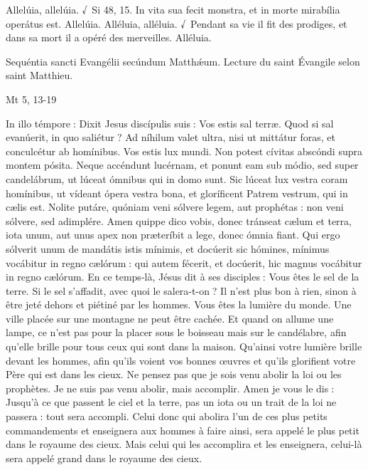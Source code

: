 \begin{paracol}{2}
Allelúia, allelúia. √~Si 48, 15. In vita sua fecit monstra, et in morte mirabília operátus est. Allelúia.
\switchcolumn
Alléluia, alléluia. √~Pendant sa vie il fit des prodiges, et dans sa mort il a opéré des merveilles. Alléluia.
\switchcolumn*

Sequéntia sancti Evangélii secúndum Matthǽum.
\switchcolumn
Lecture du saint Évangile selon saint Matthieu.
\switchcolumn*

Mt 5, 13-19
\switchcolumn

\switchcolumn*

In illo témpore : Dixit Jesus discípulis  suis : Vos estis sal terræ. Quod si sal evanúerit, in quo saliétur ? Ad níhilum valet ultra, nisi ut mittátur foras, et conculcétur ab homínibus. Vos estis lux mundi. Non potest cívitas abscóndi supra montem pósita. Neque accéndunt lucérnam, et ponunt eam sub módio, sed super candelábrum, ut lúceat ómnibus qui in domo sunt. Sic lúceat lux vestra coram homínibus, ut vídeant ópera vestra bona, et gloríficent Patrem vestrum, qui in cælis est. Nolite putáre, quóniam veni sólvere legem, aut prophétas : non veni sólvere, sed adimplére. Amen quippe dico vobis, donec tránseat cælum et terra, iota unum, aut unus apex non præteríbit a lege, donec ómnia fiant. Qui ergo sólverit unum de mandátis istis mínimis, et docúerit sic hómines, mínimus vocábitur in regno cælórum : qui autem fécerit, et docúerit, hic magnus vocábitur in regno cælórum.
\switchcolumn
En ce temps-là, Jésus dit à ses disciples :  Vous êtes le sel de la terre. Si le sel s’affadit, avec quoi le salera-t-on ? Il n’est plus bon à rien, sinon à être jeté dehors et piétiné par les hommes. Vous êtes la lumière du monde. Une ville placée sur une montagne ne peut être cachée. Et quand on allume une lampe, ce n’est pas pour la placer sous le boisseau mais sur le candélabre, afin qu’elle brille pour tous ceux qui sont dans la maison. Qu’ainsi votre lumière brille devant les hommes, afin qu’ils voient vos bonnes œuvres et qu’ils glorifient votre Père qui est dans les cieux. Ne pensez pas que je sois venu abolir la loi ou les prophètes. Je ne suis pas venu abolir, mais accomplir. Amen je vous le dis : Jusqu’à ce que passent le ciel et la terre, pas un iota ou un trait de la loi ne passera : tout sera accompli. Celui donc qui abolira l’un de ces plus petits commandements et enseignera aux hommes à faire ainsi, sera appelé le plus petit dans le royaume des cieux. Mais celui qui les accomplira et les enseignera, celui-là sera appelé grand dans le royaume des cieux.
\switchcolumn*


\end{paracol}
